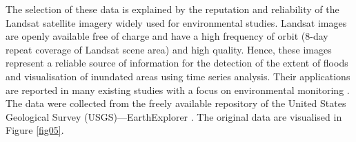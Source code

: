 \documentclass[water,article,accept,pdftex,oneauhor]{Definitions/mdpi}
\begin{document}
The selection of these data is explained by the reputation and reliability of the Landsat {satellite }imagery widely used for environmental studies. Landsat images are {openly }available free of charge and have a high {frequency of orbit (8-day repeat coverage of Landsat scene area)} and high quality. Hence, {these }images represent a reliable source of information for the detection of the extent of floods and visualisation of inundated areas using time series analysis. Their applications are reported in many existing studies with a focus on environmental monitoring \cite{Sheonty,Islam2016,Lemenkova202229,Ferdous,Lemenkova202321}. The data were collected from the {freely} available  {repository of }the United States Geological Survey (USGS){---}EarthExplorer \cite{USGSPublication}. The original data are visualised in Figure \ref{fig05}. 
\end{document}
